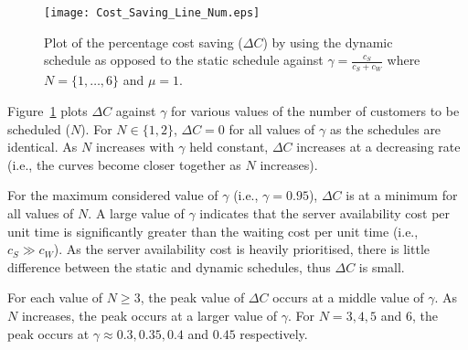 \begin{figure}[htb]
	\centering
	\texttt{[image: Cost\_Saving\_Line\_Num.eps]}
	\caption{Plot of the percentage cost saving ($\Delta C$) by using the dynamic schedule as opposed to the static schedule against $\gamma = \frac{c_{S}}{c_{S} + c_{W}}$ where $N = \{ 1, \ldots, 6 \}$ and $\mu = 1$.}
	\label{Graph_Cost_Saving}
\end{figure}

Figure~\ref{Graph_Cost_Saving} plots $\Delta C$ against $\gamma$ for various values of the number of customers to be scheduled ($N$). For $N \in \{ 1, 2 \}$, $\Delta C = 0$ for all values of $\gamma$ as the schedules are identical. As $N$ increases with $\gamma$ held constant, $\Delta C$ increases at a decreasing rate (i.e., the curves become closer together as $N$ increases).

For the maximum considered value of $\gamma$ (i.e., $\gamma = 0.95$), $\Delta C$ is at a minimum for all values of $N$. A large value of $\gamma$ indicates that the server availability cost per unit time is significantly greater than the waiting cost per unit time (i.e., $c_{S} \gg c_{W}$). As the server availability cost is heavily prioritised, there is little difference between the static and dynamic schedules, thus $\Delta C$ is small.

For each value of $N \geq 3$, the peak value of $\Delta C$ occurs at a middle value of $\gamma$. As $N$ increases, the peak occurs at a larger value of $\gamma$. For $N = 3, 4, 5$ and $6$, the peak occurs at $\gamma \approx 0.3, 0.35, 0.4$ and $0.45$ respectively.